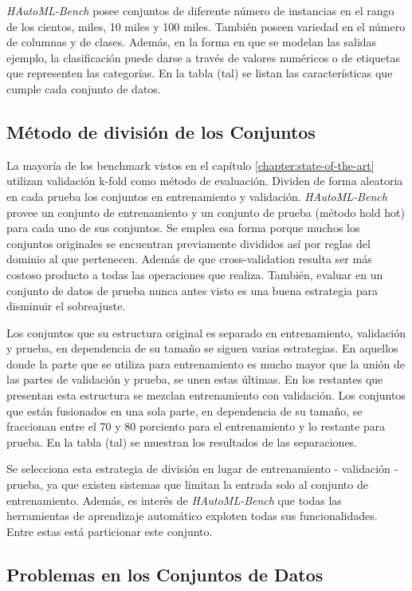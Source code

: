 \textit{HAutoML-Bench} posee conjuntos de diferente número de instancias en el rango de los cientos, 
miles, 10 miles y 100 miles. También poseen variedad en el número de columnas y de clases. Además, en la forma en que se modelan las salidas ejemplo, la clasificación 
puede darse a través de valores numéricos o de etiquetas que representen las categorías. 
En la tabla (tal) se listan las características que cumple cada conjunto de datos.

\subsection{Método de división de los Conjuntos}\label{subsection:division}

La mayoría de los benchmark vistos en el capítulo \ref{chapter:state-of-the-art} utilizan validación k-fold como método de evaluación. Dividen de forma 
aleatoria en cada prueba los conjuntos en entrenamiento y validación. \textit{HAutoML-Bench} provee un conjunto de entrenamiento y un conjunto de prueba 
(método hold hot) para cada uno de sus conjuntos. Se emplea esa forma porque muchos los conjuntos originales se encuentran previamente divididos así por reglas 
del dominio al que pertenecen. Además de que cross-validation resulta ser más costoso producto a todas las operaciones que realiza. También, evaluar en un 
conjunto de datos de prueba nunca antes visto es una buena estrategia para disminuir el sobreajuste.  

Los conjuntos que su estructura original es separado en entrenamiento, validación y prueba, en dependencia de su tamaño se siguen varias estrategias. 
En aquellos donde la parte que se utiliza para entrenamiento es mucho mayor que la unión de las partes de validación y prueba, se unen estas últimas.
En los restantes que presentan esta estructura se mezclan entrenamiento con validación. Los conjuntos que están fusionados en una sola parte, en dependencia 
de su tamaño, se fraccionan entre el 70 y 80 porciento para el entrenamiento y lo restante para prueba. En la tabla (tal) se muestran los resultados de 
las separaciones. 

Se selecciona esta estrategia de división en lugar de entrenamiento - validación - prueba, ya que existen sistemas que limitan la entrada solo al conjunto de 
entrenamiento. Además, es interés de \textit{HAutoML-Bench} que todas las herramientas de aprendizaje automático exploten todas sus funcionalidades. 
Entre estas está particionar este conjunto.

\subsection{Problemas en los Conjuntos de Datos}\label{subsection:dataproblems}

